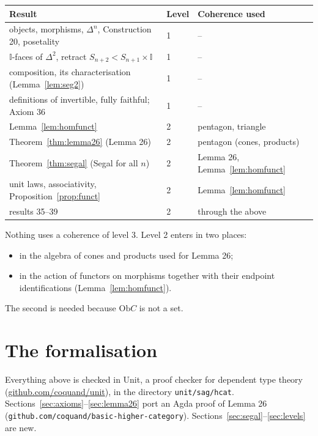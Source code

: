 \documentclass[11pt]{amsart}
\numberwithin{equation}{section}
\theoremstyle{definition}
\theoremstyle{remark}
\newcommand{\code}[1]{\texttt{#1}}
\newcommand{\Ob}{\mathrm{Ob}}
\newcommand{\II}{\mathbb{I}}
\begin{document}
\begin{center}
\begin{tabular}{>{\raggedright}p{6.6cm}l>{\raggedright\arraybackslash}p{4.6cm}}
\toprule
Result & Level & Coherence used\\
\midrule
objects, morphisms, $\Delta^n$, Construction 20, posetality & 1 & --\\
$\II$-faces of $\Delta^2$, retract $S_{n+2}<S_{n+1}\times\II$ & 1 & --\\
composition, its characterisation (Lemma~\ref{lem:seg2}) & 1 & --\\
definitions of invertible, fully faithful; Axiom 36 & 1 & --\\
Lemma~\ref{lem:homfunct} & 2 & pentagon, triangle\\
Theorem~\ref{thm:lemma26} (Lemma 26) & 2 & pentagon (cones, products)\\
Theorem~\ref{thm:segal} (Segal for all $n$) & 2 & Lemma 26, Lemma~\ref{lem:homfunct}\\
unit laws, associativity, Proposition~\ref{prop:funct} & 2 & Lemma~\ref{lem:homfunct}\\
results 35--39 & 2 & through the above\\
\bottomrule
\end{tabular}
\end{center}

\noindent
Nothing uses a coherence of level 3. Level 2 enters in two places:
\begin{itemize}
\item in the algebra of cones and products used for Lemma 26;
\item in the action of functors on morphisms together with their
  endpoint identifications (Lemma~\ref{lem:homfunct}).
\end{itemize}
The second is needed because $\Ob C$ is not a set.

\section{The formalisation}\label{sec:formal}

Everything above is checked in Unit, a proof checker for dependent type
theory (\url{github.com/coquand/unit}), in the directory
\code{unit/sag/hcat}. Sections~\ref{sec:axioms}--\ref{sec:lemma26}
port an Agda proof of Lemma 26 (\code{github.com/coquand/basic-higher-category}).
Sections~\ref{sec:segal}--\ref{sec:levels} are new.
\end{document}
